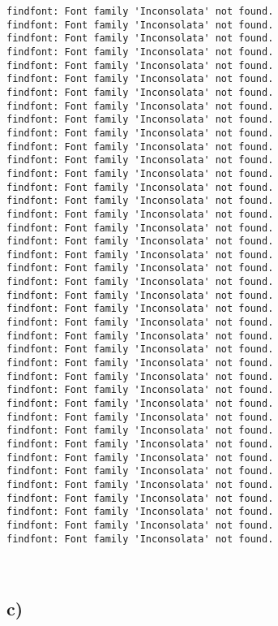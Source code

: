 \documentclass[11pt]{article}
\begin{document}
    \begin{Verbatim}[commandchars=\\\{\}]
findfont: Font family 'Inconsolata' not found.
findfont: Font family 'Inconsolata' not found.
findfont: Font family 'Inconsolata' not found.
findfont: Font family 'Inconsolata' not found.
findfont: Font family 'Inconsolata' not found.
findfont: Font family 'Inconsolata' not found.
findfont: Font family 'Inconsolata' not found.
findfont: Font family 'Inconsolata' not found.
findfont: Font family 'Inconsolata' not found.
findfont: Font family 'Inconsolata' not found.
findfont: Font family 'Inconsolata' not found.
findfont: Font family 'Inconsolata' not found.
findfont: Font family 'Inconsolata' not found.
findfont: Font family 'Inconsolata' not found.
findfont: Font family 'Inconsolata' not found.
findfont: Font family 'Inconsolata' not found.
findfont: Font family 'Inconsolata' not found.
findfont: Font family 'Inconsolata' not found.
findfont: Font family 'Inconsolata' not found.
findfont: Font family 'Inconsolata' not found.
findfont: Font family 'Inconsolata' not found.
findfont: Font family 'Inconsolata' not found.
findfont: Font family 'Inconsolata' not found.
findfont: Font family 'Inconsolata' not found.
findfont: Font family 'Inconsolata' not found.
findfont: Font family 'Inconsolata' not found.
findfont: Font family 'Inconsolata' not found.
findfont: Font family 'Inconsolata' not found.
findfont: Font family 'Inconsolata' not found.
findfont: Font family 'Inconsolata' not found.
findfont: Font family 'Inconsolata' not found.
findfont: Font family 'Inconsolata' not found.
findfont: Font family 'Inconsolata' not found.
findfont: Font family 'Inconsolata' not found.
findfont: Font family 'Inconsolata' not found.
findfont: Font family 'Inconsolata' not found.
findfont: Font family 'Inconsolata' not found.
findfont: Font family 'Inconsolata' not found.
findfont: Font family 'Inconsolata' not found.
findfont: Font family 'Inconsolata' not found.
    \end{Verbatim}

    \begin{center}
    \end{center}
    { \hspace*{\fill} \\}
    
    \hypertarget{c}{%
\subsection{c)}\label{c}}
\end{document}
